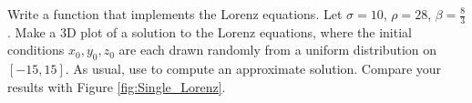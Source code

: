 \begin{comment}
\subsection*{Plotting and Interacting}
We will be making interactive 3D plots using \li{matplotlib}.
Please refer back to the \textit{Introduction to Matplotlib} lab for tips and tricks to graphing 3D.
Below is some sample code to help you out.

\begin{lstlisting}
from matplotlib import rcParams, pyplot as plt
from mpl_toolkits.mplot3d import Axes3D
rcParams['figure.figsize'] = (16,10)     #Affects output size of graphs.
'''
Code up your X, Y, Z values
'''
fig = plt.figure()
ax = fig.gca(projection='3d')
ax.plot( X, Y, Z )    #Make sure X, Y, Z are same length.
                      #Connect points (X[i], Y[i], Z[i]) for i in len(X)
ax.set_xlabel('X')
ax.set_ylabel('Y')
ax.set_zlabel('Z')

ax.set_xlim3d([min(X), max(X)])    #Bounds the axes nicely
ax.set_ylim3d([min(Y), max(Y)])
ax.set_zlim3d([min(Z), max(Z)])

plt.show()
\end{lstlisting}

Because we are plotting in 3D, we are also interested in being able to interact with the plot and rotate it to analyze what our solutions are actually doing.
To facilitate this, \li{matplotlib} has different backends which allow for various levels of control over what our graphs do.
These backends are accessed using \li{matplotlib}'s \li{switch_backend()} function with a call to whichever backend we want.
Your computer may default to a backend which you can already interact with (try clicking your plot and rotating it to see).
If not, consider using 'qt5agg', 'qt4agg', nbagg', or 'tkagg' in the function call.

\begin{lstlisting}
plt.switch_backend('qt5agg') # This backend opens the graph in a new window
\end{lstlisting}

\begin{warn}
Do not run \li{\%matplotlib inline} with this code. You will crash your kernel.
\end{warn}
\end{comment}

\begin{problem}
Write a function that implements the Lorenz equations. Let $\sigma=10$, $\rho=28$, $\beta=\frac{8}{3}$. Make a 3D plot of a solution to the Lorenz equations, where the initial conditions $x_0,y_0,z_0$ are each drawn randomly from a uniform distribution on $[-15,15]$. As usual, use  to compute an approximate solution. Compare your results with Figure \ref{fig:Single_Lorenz}.
\end{problem}


